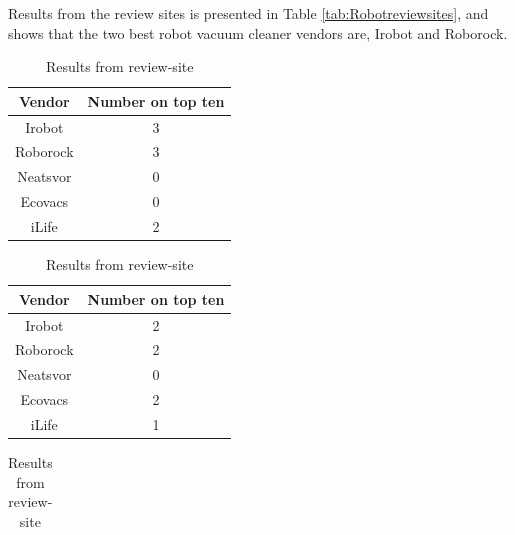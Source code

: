 Results from the review sites is presented in Table \ref{tab:Robotreviewsites}, and shows that the two best robot vacuum cleaner vendors are, Irobot and Roborock.
\begin{table}[H]
    \centering
    \caption{Robot vacuum selection review-site}
    \begin{subtable}[b]{0.45\linewidth}
        \centering
        \caption{Results from review-site \cite{robotsel11}}
        \begin{tabular}{|c|c|}
            \hline 
            \textbf{Vendor} & \textbf{Number on top ten} \\ \hline
            Irobot      & 3                 \\                   \hline
            Roborock    & 3                 \\                   \hline
            Neatsvor    & 0                 \\                   \hline
            Ecovacs     & 0                 \\                   \hline
            iLife       & 2                 \\                   \hline
        \end{tabular}
    \end{subtable}
    \hspace{0.5cm}
    \begin{subtable}[b]{0.45\linewidth}
        \centering
        \caption{Results from review-site \cite{robotsel12}}
        \begin{tabular}{|c|c|}
            \hline
            \textbf{Vendor}    & \textbf{Number on top ten} \\ \hline
            Irobot      & 2                 \\                   \hline
            Roborock    & 2                 \\                   \hline
            Neatsvor    & 0                 \\                   \hline
            Ecovacs     & 2                 \\                   \hline
            iLife       & 1                 \\                   \hline
        \end{tabular}
    \end{subtable}
    \begin{subtable}[b]{0.45\linewidth}
        \centering
        \caption{Results from review-site \cite{robotsel13}}
        \begin{tabular}{|c|c|}

\end{tabular}
\end{subtable}
\end{table}
